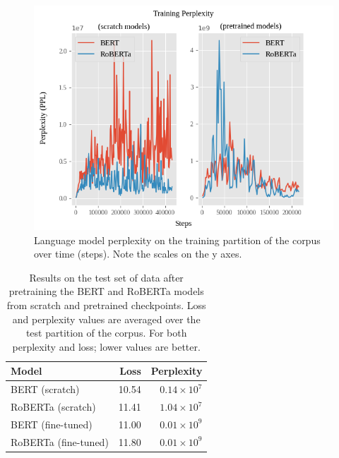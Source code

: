 \documentclass[12pt]{article}
\begin{document}
\begin{figure}[!t]
    \includegraphics[width=\linewidth]{figures/training_ppl.png}
    \caption{Language model perplexity on the training partition of the corpus over time (steps). Note the scales on the y axes.}
    \label{fig:training_ppl}
\end{figure}

\begin{table}[!t]
    \centering
    \begin{tabular}{l r r}
        \toprule
        Model                & Loss  & Perplexity        \\
        \midrule
        BERT (scratch)       & 10.54 & $0.14\times 10^7$ \\ %
        RoBERTa (scratch)    & 11.41 & $1.04\times 10^7$ \\ %
        BERT (fine-tuned)    & 11.00 & $0.01\times 10^9$ \\ %
        RoBERTa (fine-tuned) & 11.80 & $0.01\times 10^9$ \\ %
        \bottomrule
    \end{tabular}
    \caption{Results on the test set of data after pretraining the BERT and RoBERTa models from scratch and pretrained checkpoints. Loss and
        perplexity values are averaged over the test partition of the corpus. For both perplexity and loss; lower values are better.}
    \label{tab:pretraining_results}
\end{table}
\end{document}
